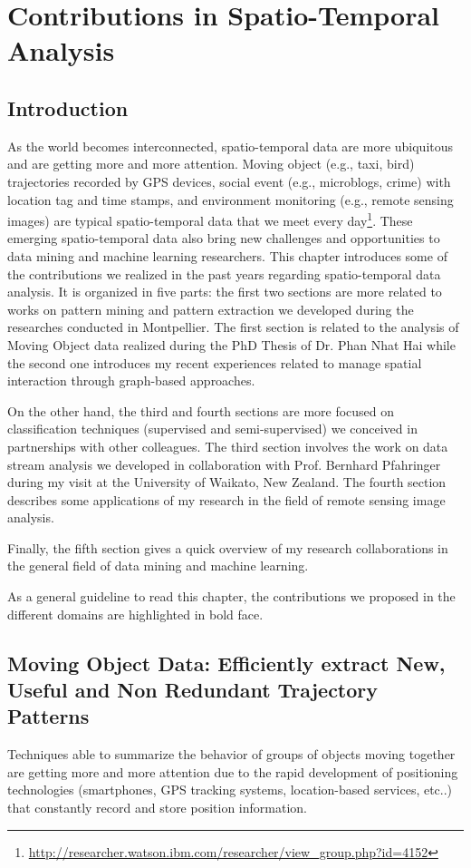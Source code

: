 \chapter{Contributions in Spatio-Temporal Analysis} %

\label{intro}

\section{Introduction}

As the world becomes interconnected, spatio-temporal data are more ubiquitous and are getting more and more attention.  Moving object (e.g., taxi, bird) trajectories recorded by GPS devices, social event (e.g., microblogs, crime) with location tag and time stamps, and environment monitoring (e.g., remote sensing images) are typical spatio-temporal data that we meet every day\footnote{\url{http://researcher.watson.ibm.com/researcher/view_group.php?id=4152}}. These emerging spatio-temporal data also bring new challenges and opportunities to data mining and machine learning researchers.
This chapter introduces some of the contributions we realized in the past years regarding spatio-temporal data analysis.
It is organized in five parts: the first two sections are more related to works on pattern mining and pattern extraction we developed during the researches conducted in Montpellier. The first section is related to the analysis of Moving Object data realized during the PhD Thesis of Dr. Phan Nhat Hai while the second one introduces my recent experiences related to manage spatial interaction through graph-based approaches.

On the other hand, the third and fourth sections are more focused on classification techniques (supervised and semi-supervised) we conceived in partnerships with other colleagues. The third section involves the work on data stream analysis we developed in collaboration with Prof. Bernhard Pfahringer during my visit at the University of Waikato, New Zealand. The fourth section describes some applications of my research in the field of remote sensing image analysis.

Finally, the fifth section gives a quick overview of my research collaborations in the general field of data mining and machine learning. 

As a general guideline to read this chapter, the contributions we proposed in the different domains are highlighted in bold face.


\section{Moving Object Data: Efficiently extract New, Useful and Non Redundant Trajectory Patterns} 
Techniques able to summarize the behavior of groups of objects moving together are getting more and more attention due to the rapid development of positioning technologies (smartphones, GPS tracking systems, location-based services, etc..) that constantly record and store position information. 

